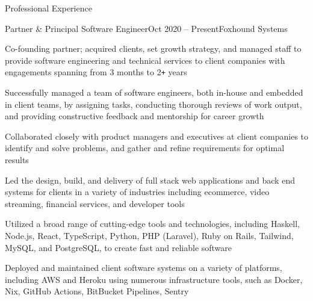 \documentclass{resume} %
\def\plus{\texttt{+}}
\begin{document}

\begin{rSection}{Professional Experience}

\begin{rSubsection}{Partner \& Principal Software Engineer}{Oct 2020 -- Present}{Foxhound Systems}{}
  \item Co-founding partner; acquired clients, set growth strategy, and managed staff to provide software engineering and technical services to client companies with engagements spanning from 3 months to 2{\plus} years
  \item Successfully managed a team of software engineers, both in-house and embedded in client teams, by assigning tasks, conducting thorough reviews of work output, and providing constructive feedback and mentorship for career growth
  \item Collaborated closely with product managers and executives at client companies to identify and solve problems, and gather and refine requirements for optimal results
  \item Led the design, build, and delivery of full stack web applications and back end systems for clients in a variety of industries including ecommerce, video streaming, financial services, and developer tools
  \item Utilized a broad range of cutting-edge tools and technologies, including Haskell, Node.js, React, TypeScript, Python, PHP (Laravel), Ruby on Rails, Tailwind, MySQL, and PostgreSQL, to create fast and reliable software
  \item Deployed and maintained client software systems on a variety of platforms, including AWS and Heroku using numerous infrastructure tools, such as Docker, Nix, GitHub Actions, BitBucket Pipelines, Sentry
\end{rSubsection}



\end{rSection}
\end{document}
